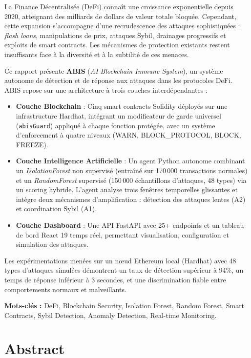 \documentclass[12pt,a4paper]{report}
\newcommand{\code}[1]{\texttt{#1}}
\begin{document}
La Finance Décentralisée (DeFi) connaît une croissance exponentielle depuis 2020, atteignant des milliards de dollars de valeur totale bloquée. Cependant, cette expansion s'accompagne d'une recrudescence des attaques sophistiquées : \textit{flash loans}, manipulations de prix, attaques Sybil, drainages progressifs et exploits de smart contracts. Les mécanismes de protection existants restent insuffisants face à la diversité et à la subtilité de ces menaces.

Ce rapport présente \textbf{ABIS} (\textit{AI Blockchain Immune System}), un système autonome de détection et de réponse aux attaques dans les protocoles DeFi. ABIS repose sur une architecture à trois couches interdépendantes :

\begin{itemize}
  \item \textbf{Couche Blockchain} : Cinq smart contracts Solidity déployés sur une infrastructure Hardhat, intégrant un modificateur de garde universel (\code{abisGuard}) appliqué à chaque fonction protégée, avec un système d'enforcement à quatre niveaux (WARN, BLOCK\_PROTOCOL, BLOCK, FREEZE).
  \item \textbf{Couche Intelligence Artificielle} : Un agent Python autonome combinant un \textit{IsolationForest} non supervisé (entraîné sur 170\,000 transactions normales) et un \textit{RandomForest} supervisé (150\,000 échantillons d'attaques, 48 types) via un scoring hybride. L'agent analyse trois fenêtres temporelles glissantes et intègre deux mécanismes d'amplification : détection des attaques lentes (A2) et coordination Sybil (A1).
  \item \textbf{Couche Dashboard} : Une API FastAPI avec 25+ endpoints et un tableau de bord React 19 temps réel, permettant visualisation, configuration et simulation des attaques.
\end{itemize}

Les expérimentations menées sur un nœud Ethereum local (Hardhat) avec 48 types d'attaques simulées démontrent un taux de détection supérieur à 94\%, un temps de réponse inférieur à 3 secondes, et une discrimination fiable entre comportements normaux et malveillants.

\textbf{Mots-clés :} DeFi, Blockchain Security, Isolation Forest, Random Forest, Smart Contracts, Sybil Detection, Anomaly Detection, Real-time Monitoring.

\newpage
\chapter*{Abstract}
\end{document}
